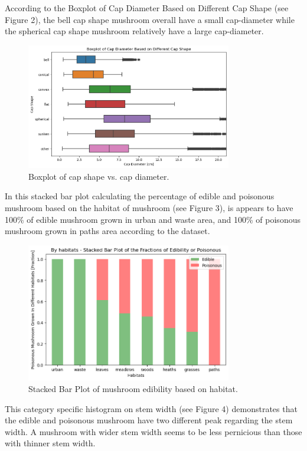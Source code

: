 \documentclass{article}
\begin{document}
\newpage
According to the Boxplot of Cap Diameter Based on Different Cap Shape (see Figure 2), the bell cap shape mushroom overall have a small cap-diameter while the spherical cap shape mushroom relatively have a large cap-diameter.

\begin{figure}[h]
\centering
\includegraphics[width=0.8\textwidth]{eda1.png}
\caption{\label{fig:boxplot} Boxplot of cap shape vs. cap diameter.}
\end{figure}

In this stacked bar plot calculating the percentage of edible and poisonous mushroom based on the habitat of mushroom (see Figure 3), is appears to have 100\% of edible mushroom grown in urban and waste area, and 100\% of poisonous mushroom grown in paths area according to the dataset. 

\begin{figure}[h]
\centering
\includegraphics[width=0.8\textwidth]{eda2.png}
\caption{\label{fig:boxplot} Stacked Bar Plot of mushroom edibility based on habitat.}
\end{figure}

\newpage
This category specific histogram on stem width (see Figure 4) demonstrates that the edible and poisonous mushroom have two different peak regarding the stem width. A mushroom with wider stem width seems to be less pernicious than those with thinner stem width.
\end{document}
